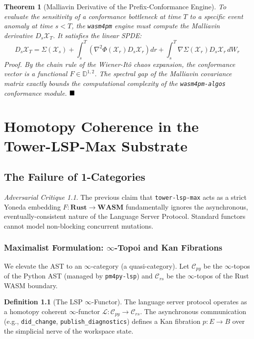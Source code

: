 \documentclass[11pt,a4paper]{book}
\theoremstyle{definition}
\newtheorem{definition}{Definition}[section]
\theoremstyle{plain}
\newtheorem{theorem}{Theorem}[section]
\theoremstyle{remark}
\newtheorem{critique}{Adversarial Critique}[section]
\begin{document}
\begin{theorem}[Malliavin Derivative of the Prefix-Conformance Engine]
To evaluate the sensitivity of a conformance bottleneck at time $T$ to a specific event anomaly at time $s < T$, the \texttt{wasm4pm} engine must compute the Malliavin derivative $D_s \mathcal{X}_T$. It satisfies the linear SPDE:
\begin{equation}
D_s \mathcal{X}_T = \Sigma(\mathcal{X}_s) + \int_s^T \left( \nabla^2 \Phi(\mathcal{X}_r) D_s \mathcal{X}_r \right) dr + \int_s^T \nabla \Sigma(\mathcal{X}_r) D_s \mathcal{X}_r \, dW_r
\end{equation}
\textit{Proof.} By the chain rule of the Wiener-It\^o chaos expansion, the conformance vector is a functional $F \in \mathbb{D}^{1,2}$. The spectral gap of the Malliavin covariance matrix exactly bounds the computational complexity of the \texttt{wasm4pm-algos} conformance module. $\hfill\blacksquare$
\end{theorem}

\chapter{Homotopy Coherence in the Tower-LSP-Max Substrate}
\section{The Failure of 1-Categories}
\begin{critique}
The previous claim that \texttt{tower-lsp-max} acts as a strict Yoneda embedding $F: \mathbf{Rust} \to \mathbf{WASM}$ fundamentally ignores the asynchronous, eventually-consistent nature of the Language Server Protocol. Standard functors cannot model non-blocking concurrent mutations.
\end{critique}

\subsection{Maximalist Formulation: $\infty$-Topoi and Kan Fibrations}
We elevate the AST to an $\infty$-category (a quasi-category). Let $\mathscr{C}_{py}$ be the $\infty$-topos of the Python AST (managed by \texttt{pm4py-lsp}) and $\mathscr{C}_{rs}$ be the $\infty$-topos of the Rust WASM boundary.

\begin{definition}[The LSP $\infty$-Functor]
The language server protocol operates as a homotopy coherent $\infty$-functor $\mathscr{L}: \mathscr{C}_{py} \to \mathscr{C}_{rs}$. The asynchronous communication (e.g., \texttt{did\_change}, \texttt{publish\_diagnostics}) defines a Kan fibration $p: E \to B$ over the simplicial nerve of the workspace state.
\end{definition}
\end{document}
